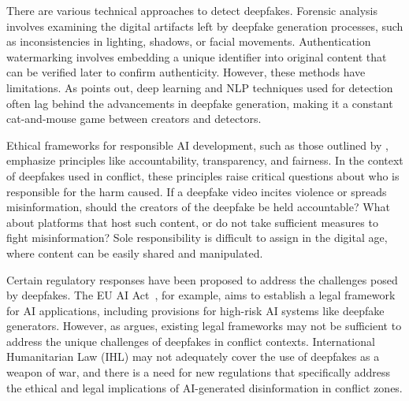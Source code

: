 
There are various technical approaches to detect deepfakes. Forensic analysis involves examining the digital artifacts left by deepfake generation processes, such as inconsistencies in lighting, shadows, or facial movements. Authentication watermarking involves embedding a unique identifier into original content that can be verified later to confirm authenticity. However, these methods have limitations. As \citet{muam2026role} points out, deep learning and NLP techniques used for detection often lag behind the advancements in deepfake generation, making it a constant cat-and-mouse game between creators and detectors.



Ethical frameworks for responsible AI development, such as those outlined by \citet{laws14060083}, emphasize principles like accountability, transparency, and fairness. In the context of deepfakes used in conflict, these principles raise critical questions about who is responsible for the harm caused. If a deepfake video incites violence or spreads misinformation, should the creators of the deepfake be held accountable? What about platforms that host such content, or do not take sufficient measures to fight misinformation? Sole responsibility is difficult to assign in the digital age, where content can be easily shared and manipulated.



Certain regulatory responses have been proposed to address the challenges posed by deepfakes. The EU AI Act~\citep{EU_AI_Act_2024}, for example, aims to establish a legal framework for AI applications, including provisions for high-risk AI systems like deepfake generators. However, as \citet{laws14060083} argues, existing legal frameworks may not be sufficient to address the unique challenges of deepfakes in conflict contexts. International Humanitarian Law (IHL) may not adequately cover the use of deepfakes as a weapon of war, and there is a need for new regulations that specifically address the ethical and legal implications of AI-generated disinformation in conflict zones.


